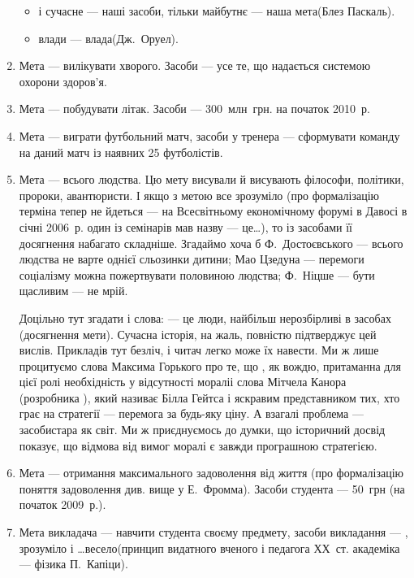 \documentclass[a4paper, 12pt]{article}
\begin{document}
\begin{enumerate}
\begin{itemize}
		\item {} і сучасне --- наші засоби, тільки майбутнє --- наша мета\guillemotright (Блез Паскаль).

		\item {} влади --- влада\guillemotright (Дж.~Оруел).
	\end{itemize}

	\item Мета --- вилікувати хворого. Засоби --- усе те, що надається системою охорони здоров'я.

	\item Мета --- побудувати літак. Засоби --- 300~млн~грн. на початок 2010~р.

	\item Мета --- виграти футбольний матч, засоби у тренера --- сформувати команду на даний матч із наявних 25 футболістів.

	\item Мета ---  всього людства\guillemotright. Цю мету висували й висувають філософи, політики, пророки, авантюристи. І якщо з метою все зрозуміло (про формалізацію терміна \guillemotright тепер не йдеться --- на Всесвітньому економічному форумі в Давосі в січні 2006~р. один із семінарів мав назву  --- це\ldots\guillemotright), то із засобами її досягнення набагато складніше. Згадаймо хоча б Ф.~Достоєвського ---  всього людства не варте однієї сльозинки дитини\guillemotright; Мао Цзедуна ---  перемоги соціалізму можна пожертвувати половиною людства\guillemotright; Ф.~Ніцше ---  бути щасливим --- не мрій\guillemotright.

	\begin{remark}
		Доцільно тут згадати і слова:  --- це люди, найбільш нерозбірливі в засобах (досягнення мети)\guillemotright. Сучасна історія, на жаль, повністю підтверджує цей вислів. Прикладів тут безліч, і читач легко може їх навести. Ми ж лише процитуємо слова Максима Горького про те, що , як вождю, притаманна для цієї ролі необхідність у відсутності моралі\guillemotright і слова Мітчела Канора (розробника \guillemotright), який називає Білла Гейтса  і яскравим представником тих, хто грає на стратегії --- перемога за будь-яку ціну\guillemotright. А взагалі проблема  --- засоби\guillemotright стара як світ. Ми ж приєднуємось до думки, що історичний досвід показує, що відмова від вимог моралі є завжди програшною стратегією.
	\end{remark}

	\item Мета --- отримання максимального задоволення від життя (про формалізацію поняття задоволення див. вище у Е.~Фромма). Засоби студента --- 50~грн (на початок 2009~р.).

	\item Мета викладача --- навчити студента своєму предмету, засоби викладання --- , зрозуміло і \ldots весело\guillemotright (принцип видатного вченого і педагога ХХ~ст. академіка --- фізика П.~Капіци).
\end{enumerate}
\end{document}

